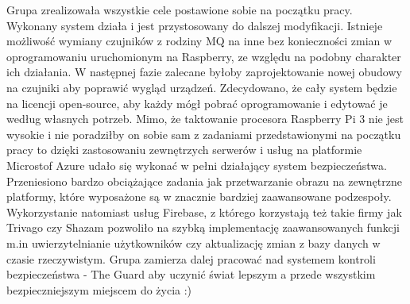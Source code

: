 Grupa zrealizowała wszystkie cele postawione sobie na początku pracy. Wykonany system działa i jest przystosowany do dalszej modyfikacji. Istnieje możliwość wymiany czujników z rodziny MQ na inne bez konieczności zmian w oprogramowaniu uruchomionym na Raspberry, ze względu na podobny charakter ich działania. W następnej fazie zalecane byłoby zaprojektowanie nowej obudowy na czujniki aby poprawić wygląd urządzeń. Zdecydowano, że cały system będzie na licencji open-source, aby każdy mógł pobrać oprogramowanie i edytować je według własnych potrzeb. Mimo, że taktowanie procesora Raspberry Pi 3 nie jest wysokie i nie poradziłby on sobie sam z zadaniami przedstawionymi na początku pracy to dzięki zastosowaniu zewnętrzych serwerów i usług na platformie Microstof Azure udało się wykonać w pełni działający system bezpieczeństwa. Przeniesiono bardzo obciążające zadania jak przetwarzanie obrazu na zewnętrzne platformy, które wyposażone są w znacznie bardziej zaawansowane podzespoły. Wykorzystanie natomiast usług Firebase, z którego korzystają też takie firmy jak Trivago czy Shazam pozwoliło na szybką implementację zaawansowanych funkcji m.in uwierzytelnianie użytkowników czy aktualizację zmian z bazy danych w czasie rzeczywistym. 
Grupa zamierza dalej pracować nad systemem kontroli bezpieczeństwa - The Guard aby uczynić świat lepszym a przede wszystkim bezpieczniejszym miejscem do życia :)
